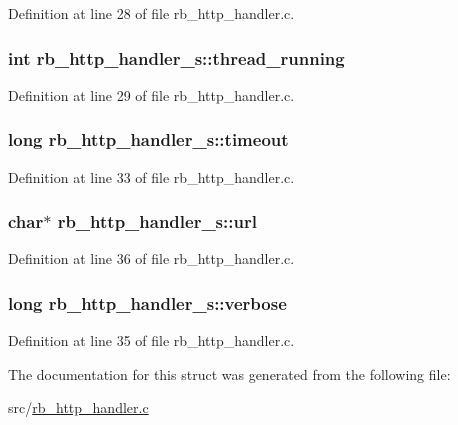 Definition at line 28 of file rb\-\_\-http\-\_\-handler.\-c.

\hypertarget{structrb__http__handler__s_a978656c7c89a80d411121107c97a0dcd}{
\subsubsection[{thread\-\_\-running}]{\setlength{\rightskip}{0pt plus 5cm}int rb\-\_\-http\-\_\-handler\-\_\-s\-::thread\-\_\-running}}\label{structrb__http__handler__s_a978656c7c89a80d411121107c97a0dcd}


Definition at line 29 of file rb\-\_\-http\-\_\-handler.\-c.

\hypertarget{structrb__http__handler__s_a619a5777839d378f50240c703558b4a8}{
\subsubsection[{timeout}]{\setlength{\rightskip}{0pt plus 5cm}long rb\-\_\-http\-\_\-handler\-\_\-s\-::timeout}}\label{structrb__http__handler__s_a619a5777839d378f50240c703558b4a8}


Definition at line 33 of file rb\-\_\-http\-\_\-handler.\-c.

\hypertarget{structrb__http__handler__s_a1f0df317f6eca7893bb08a54f13870ef}{
\subsubsection[{url}]{\setlength{\rightskip}{0pt plus 5cm}char$\ast$ rb\-\_\-http\-\_\-handler\-\_\-s\-::url}}\label{structrb__http__handler__s_a1f0df317f6eca7893bb08a54f13870ef}


Definition at line 36 of file rb\-\_\-http\-\_\-handler.\-c.

\hypertarget{structrb__http__handler__s_a0bca537c3590135753bdd217559bb422}{
\subsubsection[{verbose}]{\setlength{\rightskip}{0pt plus 5cm}long rb\-\_\-http\-\_\-handler\-\_\-s\-::verbose}}\label{structrb__http__handler__s_a0bca537c3590135753bdd217559bb422}


Definition at line 35 of file rb\-\_\-http\-\_\-handler.\-c.



The documentation for this struct was generated from the following file\-:\begin{DoxyCompactItemize}
\item 
src/\hyperlink{rb__http__handler_8c}{rb\-\_\-http\-\_\-handler.\-c}\end{DoxyCompactItemize}

